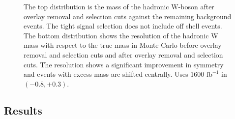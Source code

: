 \begin{figure}

\centering
       \centering
   
   
        \centering
     \caption{The top distribution is the mass of the hadronic W-boson after overlay removal and selection cuts against the remaining background events. The tight signal selection does not include off shell events. The bottom distribution shows the resolution of the hadronic W mass with respect to the true mass in Monte Carlo before overlay removal and selection cuts and after overlay removal and selection cuts. The resolution shows a significant improvement in symmetry and events with excess mass are shifted centrally.  Uses 1600 $\text{fb}^{-1}$ in $(-0.8,+0.3)$. 
}
\label{fig:money}
\end{figure}

\subsection{Results}
\label{subsec:wmass}

